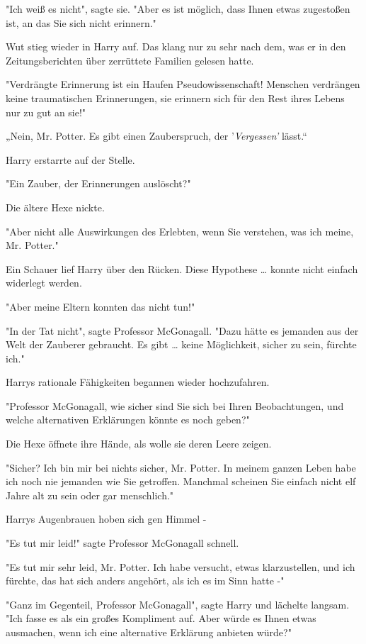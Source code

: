 {"Ich weiß es nicht", sagte sie. "Aber es ist möglich, dass Ihnen etwas zugestoßen ist, an das Sie sich nicht erinnern."

Wut stieg wieder in Harry auf. Das klang nur zu sehr nach dem, was er in den Zeitungsberichten über zerrüttete Familien gelesen hatte.

"Verdrängte Erinnerung ist ein Haufen Pseudowissenschaft! Menschen verdrängen keine traumatischen Erinnerungen, sie erinnern sich für den Rest ihres Lebens nur zu gut an sie!"

„Nein, Mr. Potter. Es gibt einen Zauberspruch, der '\emph{Vergessen'} lässt.“

Harry erstarrte auf der Stelle.

"Ein Zauber, der Erinnerungen auslöscht?"

Die ältere Hexe nickte.

"Aber nicht alle Auswirkungen des Erlebten, wenn Sie verstehen, was ich meine, Mr. Potter."

Ein Schauer lief Harry über den Rücken. Diese Hypothese … konnte nicht einfach widerlegt werden.

"Aber meine Eltern konnten das nicht tun!"

"In der Tat nicht", sagte Professor McGonagall. "Dazu hätte es jemanden aus der Welt der Zauberer gebraucht. Es gibt … keine Möglichkeit, sicher zu sein, fürchte ich."

Harrys rationale Fähigkeiten begannen wieder hochzufahren.

"Professor McGonagall, wie sicher sind Sie sich bei Ihren Beobachtungen, und welche alternativen Erklärungen könnte es noch geben?"

Die Hexe öffnete ihre Hände, als wolle sie deren Leere zeigen.

"Sicher? Ich bin mir bei nichts sicher, Mr. Potter. In meinem ganzen Leben habe ich noch nie jemanden wie Sie getroffen. Manchmal scheinen Sie einfach nicht elf Jahre alt zu sein oder gar menschlich."

Harrys Augenbrauen hoben sich gen Himmel -

"Es tut mir leid!" sagte Professor McGonagall schnell.

"Es tut mir sehr leid, Mr. Potter. Ich habe versucht, etwas klarzustellen, und ich fürchte, das hat sich anders angehört, als ich es im Sinn hatte -"

"Ganz im Gegenteil, Professor McGonagall", sagte Harry und lächelte langsam. "Ich fasse es als ein großes Kompliment auf. Aber würde es Ihnen etwas ausmachen, wenn ich eine alternative Erklärung anbieten würde?"

}
